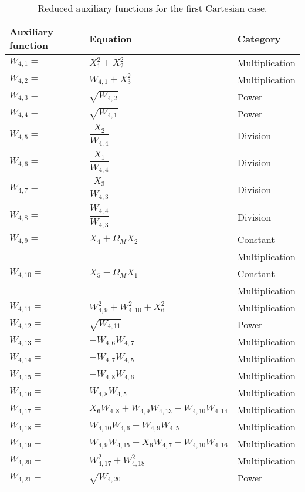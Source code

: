 \begin{longtable}{|p{1.5cm}|l|p{2cm}|}
\caption{Reduced auxiliary functions for the first Cartesian case.}
\label{tab:auxFunc1}
\endfirsthead
\endhead
\hline
\textbf{Auxiliary function} & \textbf{Equation} & \textbf{Category}  \\ \hline \hline
\hline 
$W_{4,1}=$ & $ X_{1}^{2}+X_{2}^{2} $ & Multiplication \\ \hline
$W_{4,2}=$ & $ W_{4,1}+X_{3}^{2} $ & Multiplication \\ \hline
$W_{4,3}=$ & $ \sqrt{W_{4,2}} $ & Power \\ \hline
$W_{4,4}=$ & $ \sqrt{W_{4,1}} $ & Power \\ \hline
$W_{4,5}=$ & $ \dfrac{X_{2}}{W_{4,4}} $ & Division \\ \hline
$W_{4,6}=$ & $ \dfrac{X_{1}}{W_{4,4}} $ & Division \\ \hline
$W_{4,7}=$ & $ \dfrac{X_{3}}{W_{4,3}} $ & Division \\ \hline
$W_{4,8}=$ & $ \dfrac{W_{4,4}}{W_{4,3}} $ & Division \\ \hline
$W_{4,9}=$ & $ X_{4}+\Omega_{M}X_{2} $ & Constant  \\ 
& & Multiplication \\ \hline
$W_{4,10}=$ & $ X_{5}-\Omega_{M}X_{1} $ & Constant  \\ 
& & Multiplication \\ \hline
$W_{4,11}=$ & $ W_{4,9}^{2}+W_{4,10}^{2}+X_{6}^{2} $ & Multiplication \\ \hline
$W_{4,12}=$ & $ \sqrt{W_{4,11}} $ & Power \\ \hline
$W_{4,13}=$ & $ -W_{4,6}W_{4,7} $ & Multiplication \\ \hline
$W_{4,14}=$ & $ -W_{4,7}W_{4,5} $ & Multiplication \\ \hline
$W_{4,15}=$ & $ -W_{4,8}W_{4,6} $ & Multiplication \\ \hline
$W_{4,16}=$ & $ W_{4,8}W_{4,5} $ & Multiplication \\ \hline
$W_{4,17}=$ & $ X_{6}W_{4,8}+W_{4,9}W_{4,13}+W_{4,10}W_{4,14} $ & Multiplication \\ \hline
$W_{4,18}=$ & $ W_{4,10}W_{4,6}-W_{4,9}W_{4,5} $ & Multiplication \\ \hline
$W_{4,19}=$ & $ W_{4,9}W_{4,15}-X_{6}W_{4,7}+W_{4,10}W_{4,16} $ & Multiplication \\ \hline
$W_{4,20}=$ & $ W_{4,17}^{2}+W_{4,18}^{2} $ & Multiplication \\ \hline
$W_{4,21}=$ & $ \sqrt{W_{4,20}} $ & Power \\ \hline

\end{longtable}
